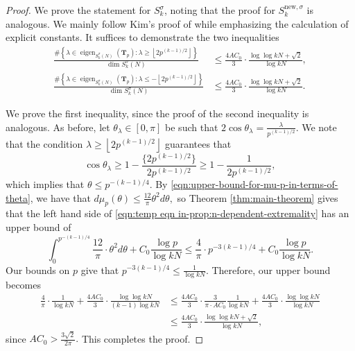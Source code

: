 \documentclass[11pt,letterpaper,reqno]{amsart}
\theoremstyle{definition}
\numberwithin{equation}{section}
\numberwithin{figure}{section}
\numberwithin{table}{section}
\newcommand{\nw}{\mathrm{new}}
\begin{document}
\begin{proof}
    We prove the statement for $S_k^\sigma$, noting that the proof for $S_k^{\nw, \sigma}$ is analogous. We mainly follow Kim's proof of \cite[Theorem 2.3]{Kim24} while emphasizing the calculation of explicit constants. It suffices to demonstrate the two inequalities
    \begin{align}
        \frac{\#\left\{ \lambda \in \operatorname{eigen}_{ S_k^\sigma(N)} \! \left( \mathbf{T}_{p}  \right) : \lambda \geq \left\lfloor 2 p^{(k - 1)/2}  \right\rfloor \right\}}{\dim S_k^\sigma(N)} &\leq \frac{4A C_0}{3} \cdot \frac{\log \log  kN + \sqrt{2}}{\log  kN}, \label{eqn:temp eqn in-prop:n-dependent-extremality}\\
        \frac{\#\left\{ \lambda \in \operatorname{eigen}_{ S_k^\sigma(N)} \! \left( \mathbf{T}_{p}  \right) : \lambda \leq -\left\lfloor 2 p^{(k - 1)/2}  \right\rfloor \right\}}{\dim S_k^\sigma(N)} &\leq \frac{4A C_0}{3} \cdot \frac{\log \log  kN + \sqrt{2}}{\log  kN}.
    \end{align}
    
    We prove the first inequality, since the proof of the second inequality is analogous. As before, let $\theta_\lambda \in [0, \pi]$ be such that $2 \cos \theta_\lambda = \frac{\lambda}{p^{(k - 1)/2}}.$ We note that the condition $\lambda \geq \left\lfloor 2 p^{(k - 1)/2} \right\rfloor$ guarantees that
    \begin{equation}
        \cos \theta_\lambda \geq 1 - \frac{\{ 2 p^{(k - 1)/2}  \}}{2 p^{(k - 1)/2}} \geq 1 - \frac{1}{2 p^{(k - 1)/2}}, \label{eqn:extremal-cosine-bound}
    \end{equation}
    which implies that $\theta \leq p^{-(k - 1)/4}.$
    By \eqref{eqn:upper-bound-for-mu-p-in-terms-of-theta}, we have that $d\mu_p(\theta) \leq \frac{12}{\pi} \theta^2 d \theta,$ so Theorem \ref{thm:main-theorem} gives that the left hand side of \eqref{eqn:temp eqn in-prop:n-dependent-extremality} has an upper bound of
    $$\int_0^{p^{-(k - 1)/4}} \frac{12}{\pi} \cdot  \theta^2 d\theta + C_0 \frac{\log p}{\log  kN} \leq \frac{4}{\pi} \cdot  p^{-3(k - 1)/4} +  C_0 \frac{\log p}{\log  kN}.$$
    Our bounds on $p$ give that $p^{-3(k - 1)/4} \leq \frac{1}{\log kN }$. Therefore, our upper bound becomes
    \begin{align}
        \frac{4}{\pi} \cdot \frac{1}{\log  kN} +  \frac{4A C_0}{3} \cdot \frac{\log \log  kN}{(k - 1)\log  kN} &\leq \frac{4 A C_0}{3} \cdot \frac{3}{\pi \cdot A C_0} \frac{1}{\log  kN} +  \frac{4A C_0}{3} \cdot \frac{\log \log  kN}{\log  kN}\\
        &\leq \frac{4A C_0}{3} \cdot \frac{\log \log  kN + \sqrt{2}}{\log  kN},
    \end{align}
    since $A C_0 > \frac{3\sqrt{2}}{2\pi}.$ This completes the proof.
\end{proof}
\end{document}
